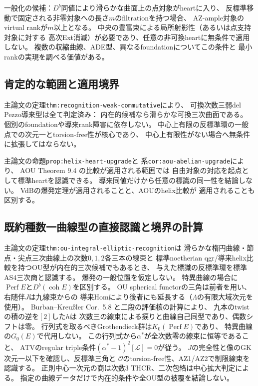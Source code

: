 \documentclass[11pt,a4paper]{ltjsarticle}
\newcommand{\coh}{\operatorname{coh}}
\begin{document}
一般化の候補：$D^b$同値により滑らかな曲面上の点対象がheartに入り、
反標準移動で固定される非零対象への長さ$m$のfiltrationを持つ場合、
AZ-ample対象のvirtual rankが$m$以上となる。
中央の豊富束による局所射影性（あるいは点支持対象に対する
高次Ext消滅）が必要であり、任意の非可換heartに無条件で適用しない。
複数の収縮曲線、ADE型、異なるfoundationについてこの条件と
最小rankの実現を調べる価値がある。

\subsection*{肯定的な範囲と適用境界}
主論文の定理\texttt{thm:recognition-weak-commutative}により、
可換次数三弱del Pezzo導来型は全て判定済み：
内在的候補なら滑らかな可換三次曲面である。
個別のfoundationや導来rank障害に依存しない。
中心上有限の反標準環の一般点での次元一とtorsion-free性が核心であり、
中心上有限性がない場合へ無条件に拡張してはならない。

主論文の命題\texttt{prop:helix-heart-upgrade}と
系\texttt{cor:aou-abelian-upgrade}により、
AOU Theorem 9.4 の比較が適用される範囲では
自由対象の対応を起点として標準heartを認識できる。
導来同値だけから任意の標識の同一性を結論しない。
VdBの爆発定理が適用されることと、AOUのhelix比較が
適用されることも区別する。

\subsection*{既約種数一曲線型の直接認識と境界の計算}
主論文の定理\texttt{thm:ou-integral-elliptic-recognition}は
滑らかな楕円曲線・節点・尖点三次曲線上の次数$0,1,2$各三本の線束と
標準noetherian qgr/導来helix比較を持つOU型が内在的三次候補でもあるとき、
与えた標識の反標準環を標準AS4三次商と認識する。
爆発の一般位置を仮定しない。
特異曲線の場合に$\operatorname{Perf}E$と$D^b(\coh E)$を区別する。
OU spherical functorの三角は前者を用い、右随伴$J$は九線束からの
導来Homにより後者にも延長する（$\Lambda$の有限大域次元を使用）。
Burban--Kreu{\ss}ler Cor.~5.8 と二段の評価核の計算により、
九本のtwistの積の逆を$[2]$した$h$は
次数三の線束による捩りと曲線自己同型であり、偶数シフトは零。
行列式を取るべきGrothendieck群は$K_0(\operatorname{Perf}E)$であり、
特異曲線の$G_0(E)$で代用しない。
この行列式から$\alpha^*$が全次数零の線束に恒等であること、
ATVのregular triple条件$(\alpha^*-1)^2[\mathcal L]=0$が従う。
$J$の完全性と像のGK次元一以下を確認し、反標準三角と
$\mathcal O$のtorsion-free性、AZ1/AZ2で制限線束を認識する。
正則中心一次元の商は次数3 THCR、二次包絡は中心拡大判定による。
指定の曲線データだけで内在的条件や全OU型の被覆を結論しない。
\end{document}

